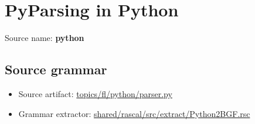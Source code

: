 \chapter{PyParsing in Python}

 Source name: \textbf{python}

\section{Source grammar}

\begin{itemize}
\item Source artifact: \href{http://github.com/grammarware/slps/blob/master/topics/fl/python/parser.py}{topics/fl/python/parser.py}
\item Grammar extractor: \href{http://github.com/grammarware/slps/blob/master/shared/rascal/src/extract/Python2BGF.rsc}{shared/rascal/src/extract/Python2BGF.rsc}
\end{itemize}

